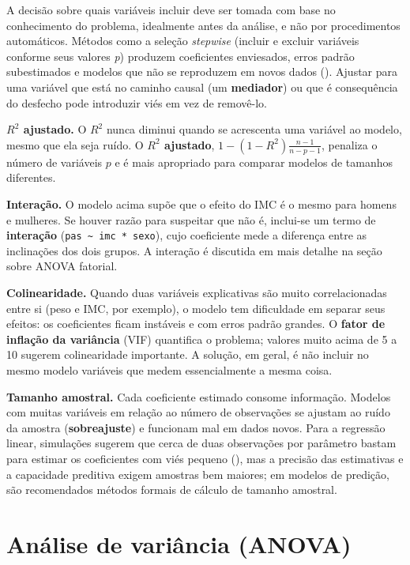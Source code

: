 \documentclass[
]{book}
\begin{document}
A decisão sobre quais variáveis incluir deve ser tomada com base no conhecimento do problema, idealmente antes da análise, e não por procedimentos automáticos. Métodos como a seleção \emph{stepwise} (incluir e excluir variáveis conforme seus valores \emph{p}) produzem coeficientes enviesados, erros padrão subestimados e modelos que não se reproduzem em novos dados (). Ajustar para uma variável que está no caminho causal (um \textbf{mediador}) ou que é consequência do desfecho pode introduzir viés em vez de removê-lo.

\textbf{\(R^2\) ajustado.} O \(R^2\) nunca diminui quando se acrescenta uma variável ao modelo, mesmo que ela seja ruído. O \textbf{\(R^2\) ajustado}, \(1 - (1 - R^2)\frac{n - 1}{n - p - 1}\), penaliza o número de variáveis \(p\) e é mais apropriado para comparar modelos de tamanhos diferentes.

\textbf{Interação.} O modelo acima supõe que o efeito do IMC é o mesmo para homens e mulheres. Se houver razão para suspeitar que não é, inclui-se um termo de \textbf{interação} (\texttt{pas\ \textasciitilde{}\ imc\ *\ sexo}), cujo coeficiente mede a diferença entre as inclinações dos dois grupos. A interação é discutida em mais detalhe na seção sobre ANOVA fatorial.

\textbf{Colinearidade.} Quando duas variáveis explicativas são muito correlacionadas entre si (peso e IMC, por exemplo), o modelo tem dificuldade em separar seus efeitos: os coeficientes ficam instáveis e com erros padrão grandes. O \textbf{fator de inflação da variância} (VIF) quantifica o problema; valores muito acima de 5 a 10 sugerem colinearidade importante. A solução, em geral, é não incluir no mesmo modelo variáveis que medem essencialmente a mesma coisa.

\textbf{Tamanho amostral.} Cada coeficiente estimado consome informação. Modelos com muitas variáveis em relação ao número de observações se ajustam ao ruído da amostra (\textbf{sobreajuste}) e funcionam mal em dados novos. Para a regressão linear, simulações sugerem que cerca de duas observações por parâmetro bastam para estimar os coeficientes com viés pequeno (), mas a precisão das estimativas e a capacidade preditiva exigem amostras bem maiores; em modelos de predição, são recomendados métodos formais de cálculo de tamanho amostral.

\section{Análise de variância (ANOVA)}\label{anuxe1lise-de-variuxe2ncia-anova}
\end{document}
